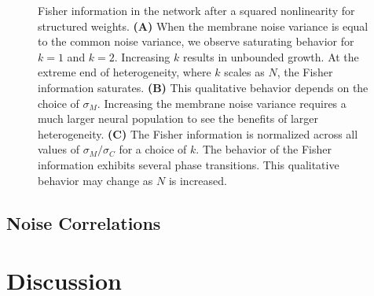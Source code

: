 \documentclass[11pt]{article}
\begin{document}
\begin{figure}[t]
	\centering
	\caption{Fisher information in the network after a squared nonlinearity for structured weights. \textbf{(A)} When the membrane noise variance is equal to the common noise variance, we observe saturating behavior for $k=1$ and $k=2$. Increasing $k$ results in unbounded growth. At the extreme end of heterogeneity, where $k$ scales as $N$, the Fisher information saturates. \textbf{(B)} This qualitative behavior depends on the choice of $\sigma_M$. Increasing the membrane noise variance requires a much larger neural population to see the benefits of larger heterogeneity. \textbf{(C)} The Fisher information is normalized across all values of $\sigma_M/\sigma_C$ for a choice of $k$. The behavior of the Fisher information exhibits several phase transitions. This qualitative behavior may change as $N$ is increased.}
\end{figure}
	
	
	\subsection{Noise Correlations}
	

	\newpage
	\section{Discussion}
	
	\begin{figure}[t]
		\centering
		\caption{} 
		\label{fig:struct-linear}
	\end{figure}
\end{document}

